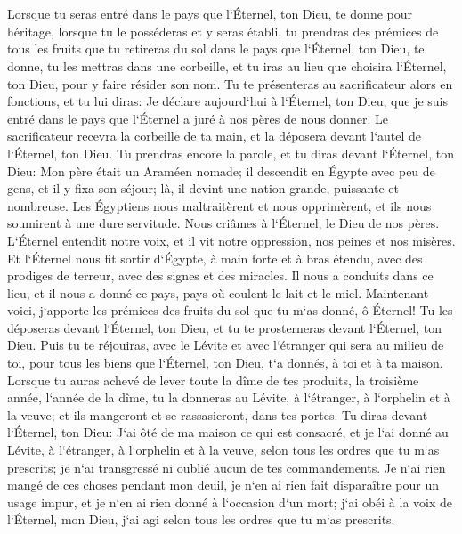 \chapter{}

\verse Lorsque tu seras entré dans le pays que l`Éternel, ton Dieu, te donne pour héritage, lorsque tu le posséderas et y seras établi, 
\verse tu prendras des prémices de tous les fruits que tu retireras du sol dans le pays que l`Éternel, ton Dieu, te donne, tu les mettras dans une corbeille, et tu iras au lieu que choisira l`Éternel, ton Dieu, pour y faire résider son nom. 
\verse Tu te présenteras au sacrificateur alors en fonctions, et tu lui diras: Je déclare aujourd`hui à l`Éternel, ton Dieu, que je suis entré dans le pays que l`Éternel a juré à nos pères de nous donner. 
\verse Le sacrificateur recevra la corbeille de ta main, et la déposera devant l`autel de l`Éternel, ton Dieu. 
\verse Tu prendras encore la parole, et tu diras devant l`Éternel, ton Dieu: Mon père était un Araméen nomade; il descendit en Égypte avec peu de gens, et il y fixa son séjour; là, il devint une nation grande, puissante et nombreuse. 
\verse Les Égyptiens nous maltraitèrent et nous opprimèrent, et ils nous soumirent à une dure servitude. 
\verse Nous criâmes à l`Éternel, le Dieu de nos pères. L`Éternel entendit notre voix, et il vit notre oppression, nos peines et nos misères. 
\verse Et l`Éternel nous fit sortir d`Égypte, à main forte et à bras étendu, avec des prodiges de terreur, avec des signes et des miracles. 
\verse Il nous a conduits dans ce lieu, et il nous a donné ce pays, pays où coulent le lait et le miel. 
\verse Maintenant voici, j`apporte les prémices des fruits du sol que tu m`as donné, ô Éternel! Tu les déposeras devant l`Éternel, ton Dieu, et tu te prosterneras devant l`Éternel, ton Dieu. 
\verse Puis tu te réjouiras, avec le Lévite et avec l`étranger qui sera au milieu de toi, pour tous les biens que l`Éternel, ton Dieu, t`a donnés, à toi et à ta maison. 
\verse Lorsque tu auras achevé de lever toute la dîme de tes produits, la troisième année, l`année de la dîme, tu la donneras au Lévite, à l`étranger, à l`orphelin et à la veuve; et ils mangeront et se rassasieront, dans tes portes. 
\verse Tu diras devant l`Éternel, ton Dieu: J`ai ôté de ma maison ce qui est consacré, et je l`ai donné au Lévite, à l`étranger, à l`orphelin et à la veuve, selon tous les ordres que tu m`as prescrits; je n`ai transgressé ni oublié aucun de tes commandements. 
\verse Je n`ai rien mangé de ces choses pendant mon deuil, je n`en ai rien fait disparaître pour un usage impur, et je n`en ai rien donné à l`occasion d`un mort; j`ai obéi à la voix de l`Éternel, mon Dieu, j`ai agi selon tous les ordres que tu m`as prescrits. 
